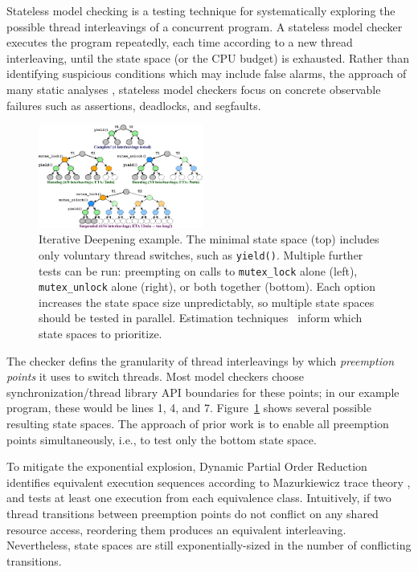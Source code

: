 Stateless model checking \cite{verisoft} is a testing technique for systematically exploring the possible thread interleavings of a concurrent program.
A stateless model checker executes the program repeatedly, each time according to a new thread interleaving, until the state space (or the CPU budget) is exhausted.
Rather than identifying suspicious conditions which may include false alarms, the approach of many static analyses \cite{racerx,coverity},
stateless model checkers focus on concrete observable failures such as assertions, deadlocks, and segfaults.

\begin{figure}[t]
	\includegraphics[width=0.48\textwidth]{trees-v2-squashed.pdf}
	\caption{Iterative Deepening example.
		The minimal state space (top) includes only voluntary thread switches, such as {\tt yield()}. %
		Multiple further tests can be run: preempting on calls to {\tt mutex\_lock} alone (left), {\tt mutex\_unlock} alone (right), or both together (bottom).
Each option increases the state space size unpredictably, so multiple state spaces should be tested in parallel.
Estimation techniques~\cite{estimation} inform which state spaces to prioritize.
}
	\label{fig:id}
\end{figure}

The checker defins the granularity of thread interleavings by which {\em preemption points} it uses to switch threads.
Most model checkers \cite{chess} choose synchronization/thread library API boundaries for these points;
in our example program, these would be lines 1, 4, and 7.
Figure~\ref{fig:id} shows several possible resulting state spaces.
The approach of prior work is to enable all preemption points simultaneously, i.e., to test only the bottom state space.

To mitigate the exponential explosion,
Dynamic Partial Order Reduction \cite{dpor} identifies equivalent execution sequences according to Mazurkiewicz trace theory \cite{mazurkiewicz},
and tests at least one execution from each equivalence class.
Intuitively, if two thread transitions between preemption points do not conflict on any shared resource access, reordering them produces an equivalent interleaving.
Nevertheless, state spaces are still exponentially-sized in the number of conflicting transitions.

